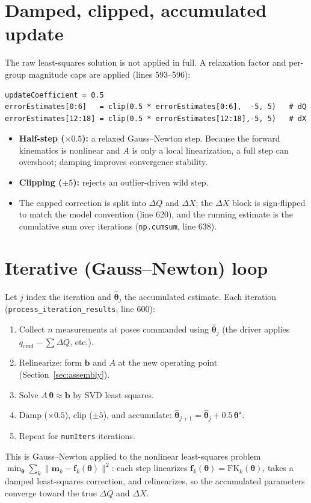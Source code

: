 \documentclass[11pt]{article}
\begin{document}
\section{Damped, clipped, accumulated update}
The raw least-squares solution is not applied in full. A relaxation factor and
per-group magnitude caps are applied (lines 593--596):
\begin{lstlisting}
updateCoefficient = 0.5
errorEstimates[0:6]   = clip(0.5 * errorEstimates[0:6],  -5, 5)   # dQ
errorEstimates[12:18] = clip(0.5 * errorEstimates[12:18],-5, 5)   # dX
\end{lstlisting}
\begin{itemize}
  \item \textbf{Half-step ($\times 0.5$):} a relaxed Gauss--Newton step. Because the
        forward kinematics is nonlinear and $A$ is only a local linearization, a full
        step can overshoot; damping improves convergence stability.
  \item \textbf{Clipping ($\pm 5$):} rejects an outlier-driven wild step.
  \item The capped correction is split into $\Delta Q$ and $\Delta X$; the
        $\Delta X$ block is sign-flipped to match the model convention (line 620),
        and the running estimate is the cumulative sum over iterations
        (\texttt{np.cumsum}, line 638).
\end{itemize}

\section{Iterative (Gauss--Newton) loop}
Let $j$ index the iteration and $\hat{\bm{\theta}}_j$ the accumulated estimate.
Each iteration (\texttt{process\_iteration\_results}, line 600):
\begin{enumerate}
  \item Collect $n$ measurements at poses commanded using $\hat{\bm{\theta}}_{j}$
        (the driver applies $q_{\text{cmd}} - \sum \Delta Q$, etc.).
  \item Relinearize: form $\bm{b}$ and $A$ at the new operating point
        (Section~\ref{sec:assembly}).
  \item Solve $A\,\bm{\theta} \approx \bm{b}$ by SVD least squares.
  \item Damp ($\times 0.5$), clip ($\pm 5$), and accumulate:
        $\hat{\bm{\theta}}_{j+1} = \hat{\bm{\theta}}_{j} + 0.5\,\bm{\theta}^{\star}$.
  \item Repeat for \texttt{numIters} iterations.
\end{enumerate}
This is Gauss--Newton applied to the nonlinear least-squares problem
$\min_{\bm{\theta}} \sum_k \| \bm{m}_k - \bm{f}_k(\bm{\theta}) \|^2$: each step
linearizes $\bm{f}_k(\bm{\theta}) = \mathrm{FK}_k(\bm{\theta})$, takes a damped
least-squares correction, and relinearizes, so the accumulated parameters converge
toward the true $\Delta Q$ and $\Delta X$.
\end{document}
